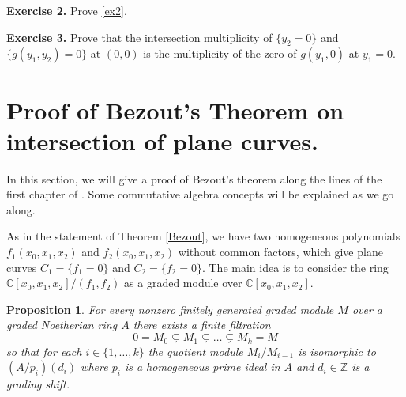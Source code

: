 \documentclass[11pt]{article}
\numberwithin{equation}{section}
\numberwithin{footnote}{section}
\newtheorem{prop}[thm]{Proposition}
\newcommand{\Z}{{\mathbb Z}}
\newcommand{\C}{{\mathbb C}}
\begin{document}
{\bf Exercise 2.} Prove \eqref{ex2}.

{\bf Exercise 3.} Prove that the intersection multiplicity of $\{y_2=0\}$ and $\{g(y_1,y_2)=0\}$ at $(0,0)$ is the multiplicity of the zero of 
$g(y_1,0)$ at $y_1=0$.


\section{Proof of Bezout's Theorem on intersection of plane curves.}\label{sec.B2}
In this section, we will give a proof of Bezout's theorem along the lines of the first chapter of \cite{Hartshorne}. Some commutative algebra concepts will be explained as we go along.

\smallskip
As in the statement of Theorem \ref{Bezout}, we have two homogeneous polynomials $f_1(x_0,x_1,x_2)$ and $f_2(x_0,x_1,x_2)$ without common factors, which give plane curves $C_1=\{f_1=0\}$ and $C_2=\{f_2=0\}$. The main idea is to consider the ring $\C[x_0,x_1,x_2]/(f_1,f_2)$  as a graded module 
over  $\C[x_0,x_1,x_2]$.

\smallskip
\begin{prop}\label{filter}
For every nonzero finitely generated graded module $M$ over a graded Noetherian ring $A$ there exists a finite filtration
$$
0=M_0\subsetneq M_1\subsetneq \ldots \subsetneq M_k=M
$$
so that for each $i\in \{1,\ldots,k\}$ the quotient module
$M_i/M_{i-1}$ is isomorphic to $(A/p_i)(d_i)$ where $p_i$ is a homogeneous prime ideal in $A$ and $d_i\in\Z$ is a grading shift.
\end{prop}
\end{document}
